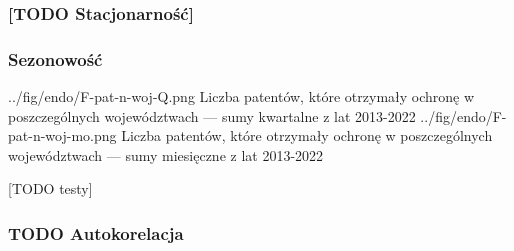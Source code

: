   \subsubsection
{[TODO Stacjonarność]}




  \newpage\subsubsection
{Sezonowość}

  \figsides
{../fig/endo/F-pat-n-woj-Q.png}
{ Liczba patentów, które otrzymały ochronę w poszczególnych województwach 
  --- sumy kwartalne z lat 2013-2022 }
{../fig/endo/F-pat-n-woj-mo.png}
{ Liczba patentów, które otrzymały ochronę w poszczególnych województwach 
  --- sumy miesięczne z lat 2013-2022 }

[TODO testy]

  \subsubsection
{TODO Autokorelacja}